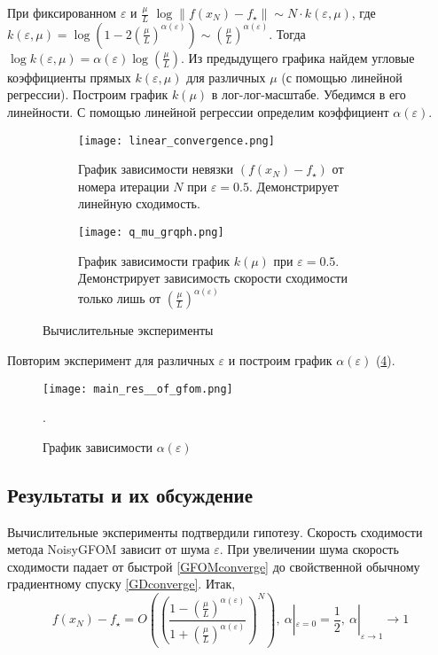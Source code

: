 \documentclass{article}
\begin{document}
При фиксированном $\varepsilon$ и $\frac{\mu}{L}$ $\log{\|f(x_N) - f_{\star}\| \sim N \cdot k(\varepsilon, \mu)}$, где $k(\varepsilon, \mu) = \log{\left(1 - 2\left(\frac{\mu}{L}\right)^{\alpha(\varepsilon)}\right)}\sim \left(\frac{\mu}{L}\right)^{\alpha(\varepsilon)}$.
Тогда $\log{k(\varepsilon, \mu)} = \alpha(\varepsilon) \log{\left(\frac{\mu}{L}\right)}$. Из предыдущего графика найдем угловые коэффициенты прямых $k(\varepsilon, \mu)$ для различных $\mu$ (с помощью линейной регрессии). Построим график $k(\mu)$ в лог-лог-масштабе. Убедимся в его линейности. С помощью линейной регрессии определим коэффициент $\alpha(\varepsilon)$. 
\begin{figure}[htp]
     \centering
     \begin{subfigure}[b]{0.45\textwidth}
         \centering
         \texttt{[image: linear\_convergence.png]}
         \caption{График зависимости невязки $(f(x_N) - f_{\star})$ от номера итерации $N$ при $\varepsilon = 0.5$. Демонстрирует линейную сходимость.}
         \label{fig:linear_conv}
     \end{subfigure}
     \hfill
     \begin{subfigure}[b]{0.45\textwidth}
         \centering
         \texttt{[image: q\_mu\_grqph.png]}
         \caption{График зависимости график $k(\mu)$ при $\varepsilon = 0.5$. Демонстрирует зависимость скорости сходимости только лишь от $\left(\frac{\mu}{L}\right)^{\alpha(\varepsilon)}$}
         \label{fig:three sin x}
     \end{subfigure}
     \hfill
        \caption{Вычислительные эксперименты}
        \label{fig:two graphs}
\end{figure}


Повторим эксперимент для различных $\varepsilon$ и построим график $\alpha(\varepsilon)$ (\ref{fig:main_res}).
\begin{figure}[htp]
\centering
\texttt{[image: main\_res\_\_of\_gfom.png]}
    \caption{График зависимости $\alpha(\varepsilon)$}.
    \label{fig:main_res}
\end{figure}

\subsection{Результаты и их обсуждение}

Вычислительные эксперименты подтвердили гипотезу. Скорость сходимости метода NoisyGFOM зависит от шума $\varepsilon$. При увеличении шума скорость сходимости падает от быстрой \eqref{GFOMconverge} до свойственной обычному градиентному спуску \eqref{GDconverge}. Итак, 
\begin{equation}\label{NoisyGFOMconverge}
   f(x_N) - f_{\star} = O\left(\left(\frac{1 - \left(\frac{\mu}{L}\right)^{\alpha(\varepsilon)}}{1 + \left(\frac{\mu}{L}\right)^{\alpha(\varepsilon)}}\right)^N\right),  \
   \alpha|_{\varepsilon = 0} = \frac12, \ \alpha|_{\varepsilon \rightarrow 1} \rightarrow 1
\end{equation}
\end{document}
